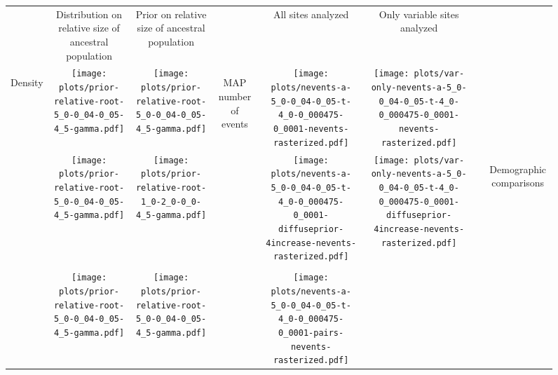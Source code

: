 \documentclass[border=10pt,varwidth=30cm]{standalone}
\begin{document}
\begin{figure}
    \setlength\arrayrulewidth{2pt}
    \centering
    \begin{tabular}{@{}cccccccc@{}}
        & \multirow{1}{0.15\textwidth}{\centering\Large Distribution on relative size of ancestral population}
        & \multirow{1}{0.15\textwidth}{\centering\Large Prior on relative size of ancestral population}
        &
        & \multirow{1}{0.15\textwidth}{\centering\Large All sites analyzed}
        & \multirow{1}{0.15\textwidth}{\centering\Large Only variable sites analyzed}
        & 
        & \\[9ex]
        \multirow{5}{*}[-8em]{\begin{sideways}\large Density\end{sideways}}
        & \texttt{[image: plots/prior-relative-root-5\_0-0\_04-0\_05-4\_5-gamma.pdf]}
        & \texttt{[image: plots/prior-relative-root-5\_0-0\_04-0\_05-4\_5-gamma.pdf]}
        & \multirow{5}{*}[-4em]{\begin{sideways}\large MAP number of events\end{sideways}}
        & \texttt{[image: plots/nevents-a-5\_0-0\_04-0\_05-t-4\_0-0\_000475-0\_0001-nevents-rasterized.pdf]}
        & \texttt{[image: plots/var-only-nevents-a-5\_0-0\_04-0\_05-t-4\_0-0\_000475-0\_0001-nevents-rasterized.pdf]} 
        & \multicolumn{1}{c|}{} 
        & \\
        & \texttt{[image: plots/prior-relative-root-5\_0-0\_04-0\_05-4\_5-gamma.pdf]}
        & \texttt{[image: plots/prior-relative-root-1\_0-2\_0-0\_0-4\_5-gamma.pdf]}
        &
        & \texttt{[image: plots/nevents-a-5\_0-0\_04-0\_05-t-4\_0-0\_000475-0\_0001-diffuseprior-4increase-nevents-rasterized.pdf]}
        & \texttt{[image: plots/var-only-nevents-a-5\_0-0\_04-0\_05-t-4\_0-0\_000475-0\_0001-diffuseprior-4increase-nevents-rasterized.pdf]}
        & \multicolumn{1}{c|}{} 
        & \multirow{5}{*}[17em]{\begin{sideways}\Large Demographic comparisons\end{sideways}} \\
        & & & & & & & \\
        & \texttt{[image: plots/prior-relative-root-5\_0-0\_04-0\_05-4\_5-gamma.pdf]}
        & \texttt{[image: plots/prior-relative-root-5\_0-0\_04-0\_05-4\_5-gamma.pdf]}
        &
        & \texttt{[image: plots/nevents-a-5\_0-0\_04-0\_05-t-4\_0-0\_000475-0\_0001-pairs-nevents-rasterized.pdf]}

\end{tabular}
\end{figure}
\end{document}
